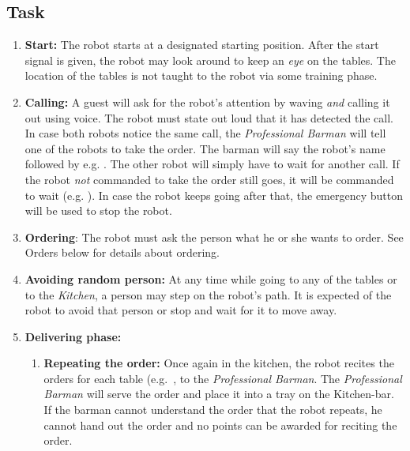 \subsection{Task}
\begin{enumerate}
	\item \textbf{Start:} The robot starts at a designated starting position. After the start signal is given, the robot may look around to keep an \textit{eye} on the tables.
	  The location of the tables is not taught to the robot via some training phase. 
	
	\item \textbf{Calling:} A guest will ask for the robot's attention by waving \emph{and} calling it out using voice. 
	  The robot must state out loud that it has detected the call.
	  In case both robots notice the same call, the \textit{Professional Barman} will tell one of the robots to take the order. 
	  The barman will say the robot's name followed by  e.g. . 
	  The other robot will simply have to wait for another call. 
	  If the robot \textit{not} commanded to take the order still goes, it will be commanded to wait (e.g. ). 
	  In case the robot keeps going after that, the emergency button will be used to stop the robot. 
	
	
	\item \textbf{Ordering}: The robot must ask the person what he or she wants to order. See Orders below for details about ordering.
	\item \textbf{Avoiding random person:} At any time while going to any of the tables or to the \textit{Kitchen}, a person may step on the robot's path. 
	  It is expected of the robot to avoid that person or stop and wait for it to move away.

	\item \textbf{Delivering phase:}
	\begin{enumerate}
		\item \textbf{Repeating the order:} Once again in the kitchen, the robot recites the orders for each table (e.g.~\textit{}, to the \textit{Professional Barman}. 
		  The \textit{Professional Barman} will serve the order and place it into a tray on the Kitchen-bar.
		  If the barman cannot understand the order that the robot repeats, he cannot hand out the order and no points can be awarded for reciting the order.


\end{enumerate}
\end{enumerate}

